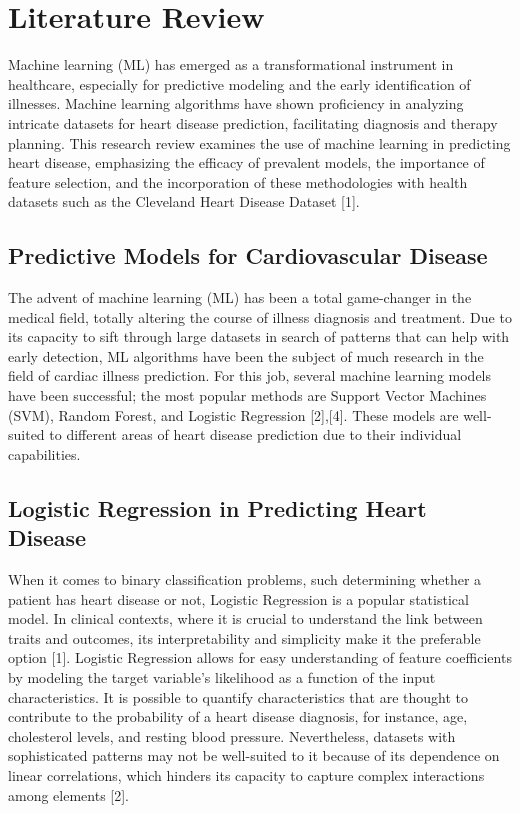 \section{Literature Review}

Machine learning (ML) has emerged as a transformational instrument in healthcare, especially for predictive modeling and the early identification of illnesses. Machine learning algorithms have shown proficiency in analyzing intricate datasets for heart disease prediction, facilitating diagnosis and therapy planning. This research review examines the use of machine learning in predicting heart disease, emphasizing the efficacy of prevalent models, the importance of feature selection, and the incorporation of these methodologies with health datasets such as the Cleveland Heart Disease Dataset [1].

\subsection{Predictive Models for Cardiovascular Disease}

The advent of machine learning (ML) has been a total game-changer in the medical field, totally altering the course of illness diagnosis and treatment. Due to its capacity to sift through large datasets in search of patterns that can help with early detection, ML algorithms have been the subject of much research in the field of cardiac illness prediction. For this job, several machine learning models have been successful; the most popular methods are Support Vector Machines (SVM), Random Forest, and Logistic Regression [2],[4]. These models are well-suited to different areas of heart disease prediction due to their individual capabilities.

\subsection{Logistic Regression in Predicting Heart Disease}
When it comes to binary classification problems, such determining whether a patient has heart disease or not, Logistic Regression is a popular statistical model. In clinical contexts, where it is crucial to understand the link between traits and outcomes, its interpretability and simplicity make it the preferable option [1]. Logistic Regression allows for easy understanding of feature coefficients by modeling the target variable's likelihood as a function of the input characteristics. It is possible to quantify characteristics that are thought to contribute to the probability of a heart disease diagnosis, for instance, age, cholesterol levels, and resting blood pressure. Nevertheless, datasets with sophisticated patterns may not be well-suited to it because of its dependence on linear correlations, which hinders its capacity to capture complex interactions among elements [2].

